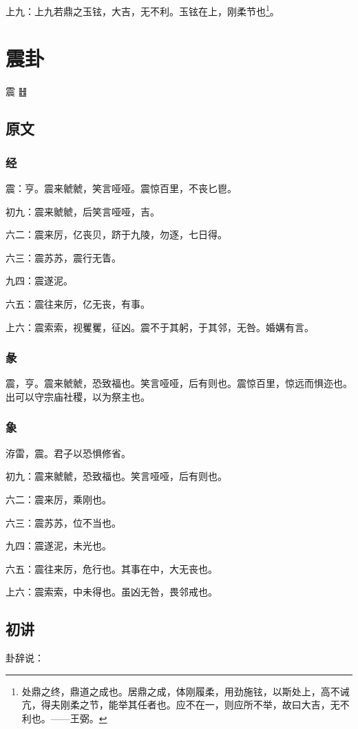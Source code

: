 \documentclass[12pt,oneside]{book}
\begin{document}
上九：上九若鼎之玉铉，大吉，无不利。玉铉在上，刚柔节也\footnote{处鼎之终，鼎道之成也。居鼎之成，体刚履柔，用劲施铉，以斯处上，高不诫亢，得夫刚柔之节，能举其任者也。应不在一，则应所不举，故曰大吉，无不利也。——王弼。}。




\chapter{震卦}
震 {\large ䷲}
\section{原文}

\subsection{经}
震：亨。震来虩虩，笑言哑哑。震惊百里，不丧匕鬯。

初九：震来虩虩，后笑言哑哑，吉。

六二：震来厉，亿丧贝，跻于九陵，勿逐，七日得。

六三：震苏苏，震行无眚。

九四：震遂泥。

六五：震往来厉，亿无丧，有事。

上六：震索索，视矍矍，征凶。震不于其躬，于其邻，无咎。婚媾有言。

\subsection{彖}
震，亨。震来虩虩，恐致福也。笑言哑哑，后有则也。震惊百里，惊远而惧迩也。 出可以守宗庙社稷，以为祭主也。

\subsection{象}
洊雷，震。君子以恐惧修省。

初九：震来虩虩，恐致福也。笑言哑哑，后有则也。

六二：震来厉，乘刚也。

六三：震苏苏，位不当也。

九四：震遂泥，未光也。

六五：震往来厉，危行也。其事在中，大无丧也。

上六：震索索，中未得也。虽凶无咎，畏邻戒也。


\section{初讲}
卦辞说：
\end{document}
